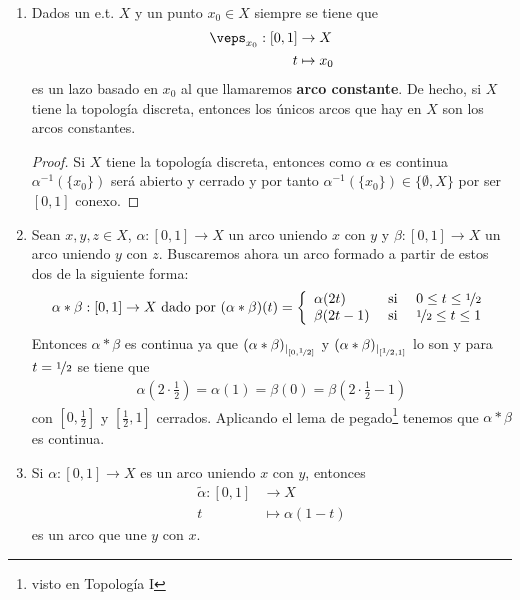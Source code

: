 \begin{ejemplo}\
    \begin{enumerate}
        \item Dados un e.t. $X$ y un punto $x_0\in X$ siempre se tiene que
        \begin{align*}
            \veps_{x_0}:[0,1]&\to X\\
            t &\mapsto x_0
        \end{align*}
        es un lazo basado en $x_0$ al que llamaremos \textbf{arco constante}. De hecho, si $X$ tiene la topología discreta, entonces los únicos arcos que hay en $X$ son los arcos constantes.
        \begin{proof}
            Si $X$ tiene la topología discreta, entonces como $\alpha$ es continua $\alpha^{-1}(\{x_0\})$ será abierto y cerrado y por tanto $\alpha^{-1}(\{x_0\})\in\{\emptyset, X\}$ por ser $[0,1]$ conexo.
        \end{proof}


        \item Sean $x,y,z\in X$, $\alpha:[0,1]\to X$ un arco uniendo $x$ con $y$ y $\beta:[0,1]\to X$ un arco uniendo $y$ con $z$. Buscaremos ahora un arco formado a partir de estos dos de la siguiente forma:
        \begin{align*}
            \alpha\ast\beta : [0,1]\to X \text{ dado por } (\alpha\ast\beta)(t) = \left\{ 
                \begin{array}{l c c}
                    \alpha(2t) & \text{ si } & 0 \leq t \leq \nicefrac{1}{2} \\
                    \beta(2t-1) & \text{ si } & \nicefrac{1}{2}\leq t \leq 1
                \end{array}
            \right.
        \end{align*}
        Entonces $\alpha\ast\beta$ es continua ya que $(\alpha\ast\beta)_{|_{[0,\nicefrac{1}{2}]}}$ y $(\alpha\ast\beta)_{|_{[\nicefrac{1}{2},1]}}$ lo son y para $t=\nicefrac{1}{2}$ se tiene que
        \begin{gather*}
            \alpha \left(2 \cdot \frac{1}{2}\right) = \alpha(1) = \beta(0) = \beta\left(2\cdot \frac{1}{2} -1\right)
        \end{gather*}
        con $\left[0, \frac{1}{2}\right]$ y $\left[\frac{1}{2}, 1\right]$ cerrados. Aplicando el lema de pegado\footnote{visto en Topología I} tenemos que $\alpha\ast \beta$ es continua.

        \item Si $\alpha:[0,1]\to X$ es un arco uniendo $x$ con $y$, entonces
        \begin{align*}
            \tilde{\alpha}:[0,1]&\to X\\
            t & \mapsto \alpha(1-t)
        \end{align*}
        es un arco que une $y$ con $x$.
    \end{enumerate}
\end{ejemplo}

